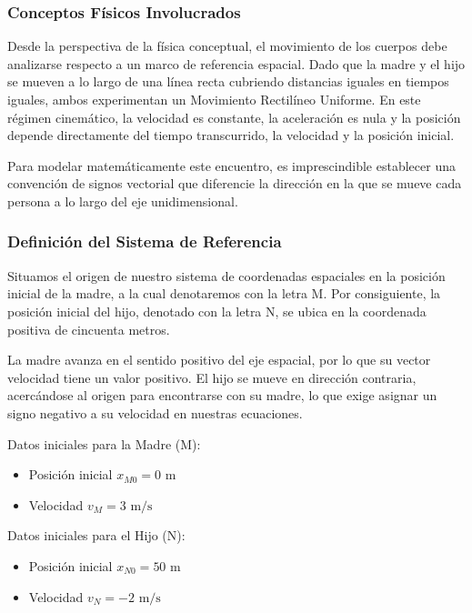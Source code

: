 \documentclass[12pt, a4paper]{article}
\begin{document}
\subsubsection*{Conceptos Físicos Involucrados}

Desde la perspectiva de la física conceptual, el movimiento de los cuerpos debe analizarse respecto a un marco de referencia espacial. Dado que la madre y el hijo se mueven a lo largo de una línea recta cubriendo distancias iguales en tiempos iguales, ambos experimentan un Movimiento Rectilíneo Uniforme. En este régimen cinemático, la velocidad es constante, la aceleración es nula y la posición depende directamente del tiempo transcurrido, la velocidad y la posición inicial.

Para modelar matemáticamente este encuentro, es imprescindible establecer una convención de signos vectorial que diferencie la dirección en la que se mueve cada persona a lo largo del eje unidimensional.

\subsubsection*{Definición del Sistema de Referencia}

Situamos el origen de nuestro sistema de coordenadas espaciales en la posición inicial de la madre, a la cual denotaremos con la letra M. Por consiguiente, la posición inicial del hijo, denotado con la letra N, se ubica en la coordenada positiva de cincuenta metros.

La madre avanza en el sentido positivo del eje espacial, por lo que su vector velocidad tiene un valor positivo. El hijo se mueve en dirección contraria, acercándose al origen para encontrarse con su madre, lo que exige asignar un signo negativo a su velocidad en nuestras ecuaciones.

Datos iniciales para la Madre (M):
\begin{itemize}
    \item Posición inicial $x_{M0} = 0 \text{ m}$
    \item Velocidad $v_M = 3 \text{ m/s}$
\end{itemize}

Datos iniciales para el Hijo (N):
\begin{itemize}
    \item Posición inicial $x_{N0} = 50 \text{ m}$
    \item Velocidad $v_N = -2 \text{ m/s}$
\end{itemize}
\end{document}
